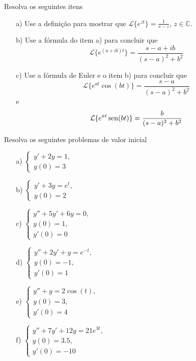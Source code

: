 \begin{Exercise}Resolva os seguintes itens
\begin{itemize}
 \item[a)] Use a definição para mostrar que $\mathcal{L}\{e^{zt}\}=\frac{1}{s-z}$, $z\in\mathbb{C}$.
 \item[b)] Use a fórmula do item a) para concluir que
 $$
 \mathcal{L}\{e^{(a+ib)t}\}=\frac{s-a+ib}{(s-a)^2+b^2}
 $$
 \item[c)] Use a fórmula de Euler e o item b) para concluir que
 $$
 \mathcal{L}\{e^{at}\cos(bt)\}=\frac{s-a}{(s-a)^2+b^2}
 $$
 e
 $$
 \mathcal{L}\{e^{at}\operatorname{sen}(bt)\}=\frac{b}{(s-a)^2+b^2}
 $$
\end{itemize}

 
\end{Exercise}

\begin{Exercise} Resolva os seguintes problemas de valor inicial
 \begin{itemize}
  \item[a)] $\displaystyle \left\{\begin{array}{l}y'+2y=1,\\ y(0)=3 \end{array}\right.$
    \item[b)] $\displaystyle \left\{\begin{array}{l}y'+3y=e^t,\\ y(0)=2 \end{array}\right.$
    \item[c)] $\displaystyle \left\{\begin{array}{l}y''+5y'+6y=0,\\ y(0)=1,\\ y'(0)=0 \end{array}\right.$
    \item[d)] $\displaystyle \left\{\begin{array}{l}y''+2y'+y=e^{-t},\\ y(0)=-1,\\ y'(0)=1 \end{array}\right.$
    \item[e)] $\displaystyle \left\{\begin{array}{l}y'' +  y = 2 \cos(t),\\ y(0)=3,\\ y'(0)=4 \end{array}\right.$
    \item[f)] $\displaystyle \left\{\begin{array}{l}y'' +7 y' +12 y = 21 e^{3t},\\ y(0)=3.5, \\ y'(0)=-10 \end{array}\right.$
 \end{itemize}

\end{Exercise}

